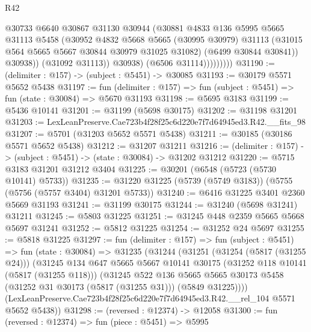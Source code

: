 \begin{lexlean}{R42}
\begin{coremodule}
                          @30733
                          @6640
                          @30867
                          @31130
                          @30944
                          (@30881
                            @4833
                            @136
                            @5995
                            @5665
                            @31113
                            @5458
                            (@30952
                              @4832
                              @5668
                              @5665
                              (@30995 @30979)
                              @31113
                              (@31015 @564 @5665 @5667 @30844 @30979 @31025 @31082)
                              (@6499 @30844 @30841))
                            @30938))
                        (@31092 @31113))
                      @30938)
                    (@6506 @31114)))))))))
@31190 := (delimiter : @157) -> (subject : @5451) -> @30085
@31193 := @30179 @5571 @5652 @5438
@31197 := fun (delimiter : @157) => fun (subject : @5451) => fun (state : @30084) => @5670 @31193
@31198 := @5695 @3183
@31199 := @5436 @10141
@31201 := @31199 (@5698 @30175)
@31202 := @31198 @31201
@31203 := LexLeanPreserve.Cae723b4f28f25c6d220e7f7d64945ed3.R42.__fits_98
@31207 := @5701 (@31203 @5652 @5571 @5438)
@31211 := @30185 (@30186 @5571 @5652 @5438)
@31212 := @31207 @31211
@31216 := (delimiter : @157) -> (subject : @5451) -> (state : @30084) -> @31202 @31212
@31220 := @5715 @3183 @31201 @31212 @3404
@31225 := @30201 (@6548 (@5723 (@5730 @10141) @5733))
@31235 := @31220 @31225 (@5739 (@5749 @3183)) (@5755 (@5756 (@5757 @3404) @31201 @5733))
@31240 := @6416 @31225 @3401 @2360 @5669 @31193
@31241 := @31199 @30175
@31244 := @31240 (@5698 @31241) @31211
@31245 := @5803 @31225
@31251 := @31245 @448 @2359 @5665 @5668 @5697 @31241
@31252 := @5812 @31225
@31254 := @31252 @24 @5697
@31255 := @5818 @31225
@31297 := fun (delimiter : @157) =>
  fun (subject : @5451) =>
  fun (state : @30084) =>
  @31235
    (@31244
      (@31251
        (@31254 (@5817 (@31255 @24)))
        (@31245
          @134
          @647
          @5665
          @5667
          @10141
          @30175
          (@31252 @118 @10141 (@5817 (@31255 @118)))
          (@31245
            @522
            @136
            @5665
            @5665
            @30173
            @5458
            (@31252 @31 @30173 (@5817 (@31255 @31)))
            (@5849 @31225))))
      (LexLeanPreserve.Cae723b4f28f25c6d220e7f7d64945ed3.R42.__rel_104 @5571 @5652 @5438))
@31298 := (reversed : @12374) -> @12058
@31300 := fun (reversed : @12374) => fun (piece : @5451) => @5995

\end{coremodule}
\end{lexlean}
